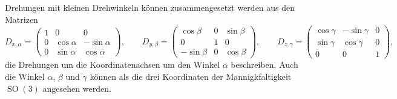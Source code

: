 Drehungen mit kleinen Drehwinkeln können zusammengesetzt werden
aus den Matrizen
\[
D_{x,\alpha}
=
\begin{pmatrix}
1&0&0\\
0&\cos\alpha&-\sin\alpha\\
0&\sin\alpha& \cos\alpha
\end{pmatrix},
\qquad
D_{y,\beta}
=
\begin{pmatrix}
 \cos\beta&0&\sin\beta\\
      0    &1&     0    \\
-\sin\beta&0&\cos\beta
\end{pmatrix},
\qquad
D_{z,\gamma}
=
\begin{pmatrix}
\cos\gamma&-\sin\gamma&0\\
\sin\gamma& \cos\gamma&0\\
    0     &     0     &1
\end{pmatrix},
\]
die Drehungen um die Koordinatenachsen um den Winkel $\alpha$
beschreiben.
Auch die Winkel $\alpha$, $\beta$ und $\gamma$ können als die
drei Koordinaten der Mannigkfaltigkeit $\operatorname{SO}(3)$
angesehen werden.

%
%
